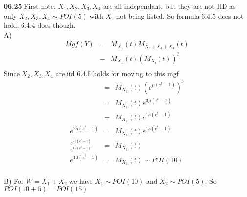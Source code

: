 {\bf 06.25} \quad First note, $X_1, X_2, X_3, X_4$ are all independant, but they are not IID as only $X_2, X_3, X_4 \sim POI(5)$ with $X_1$ not being listed. So formula 6.4.5 does not hold. 6.4.4 does though. \\

A)\\
\begin{eqnarray*}
Mgf(Y) &=& M_{X_1}(t) M_{X_2 + X_3 + X_4}(t) \\
	&=& M_{X_1}(t) (M_{X_{i}}(t))^3 \\
\end{eqnarray*}
Since $X_2, X_3, X_4$ are iid 6.4.5 holds for moving to this mgf \\
\begin{eqnarray*}
	&=& M_{X_1}(t) (e^{\mu(e^t - 1)})^3 \\
	&=& M_{X_1}(t) e^{3\mu(e^t - 1)} \\
	&=& M_{X_1}(t) e^{15(e^t -1)} \\
e^{25(e^t -1)}	&=& M_{X_1}(t) e^{15(e^t -1)}\\
\frac{e^{25(e^t -1)}}{e^{15(e^t -1)}} &=& M_{X_1}(t)\\
e^{10(e^t -1)}	&=& M_{X_1}(t) \sim POI(10)\\
\end{eqnarray*}

B) For $W = X_1 + X_2$ we have $X_1 \sim POI(10)$ and $X_2 \sim POI(5)$. So $POI(10 + 5) = POI(15)$
